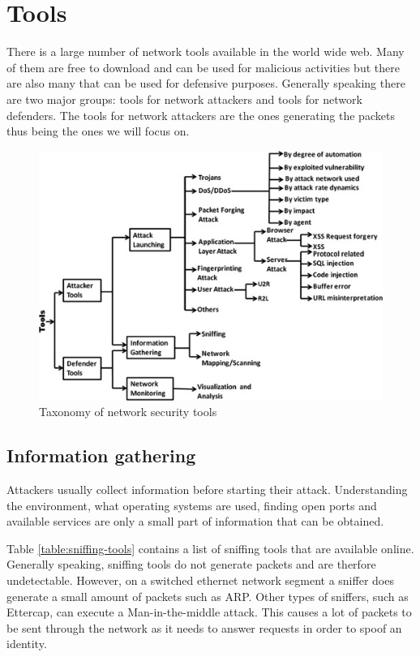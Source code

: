 \documentclass[conference]{IEEEtran}
\begin{document}
\section{Tools}

There is a large number of network tools available in the world wide web. Many of them are free to download and can be used for malicious activities but there are also many that can be used for defensive purposes. Generally speaking there are two major groups: tools for network attackers and tools for network defenders.\cite{b1} The tools for network attackers are the ones generating the packets thus being the ones we will focus on. 

\begin{figure}[htbp]  
\centerline{\includegraphics[scale=.65]{network-tools.jpg}}
\caption{Taxonomy of network security tools \cite{b1}}
\end{figure}

\subsection{Information gathering}
Attackers usually collect information before starting their attack. Understanding the environment, what operating systems are used, finding open ports and available services are only a small part of information that can be obtained. 

\smallskip Table \ref{table:sniffing-tools} contains a list of sniffing tools that are available online. Generally speaking, sniffing tools do not generate packets and are therfore undetectable. However, on a switched ethernet network segment a sniffer does generate a small amount of packets such as ARP\cite{b9}. Other types of sniffers, such as Ettercap, can execute a Man-in-the-middle attack. This causes a lot of packets to be sent through the network as it needs to answer requests in order to spoof an identity.
\end{document}
